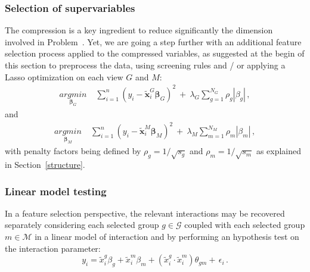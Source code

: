 \documentclass[]{book}
\begin{document}
\hypertarget{selection-of-supervariables}{%
\subsubsection*{Selection of supervariables}\label{selection-of-supervariables}}

The compression is a key ingredient to reduce significantly the
dimension involved in Problem~. Yet, we are going a step further with an
additional feature selection process applied to the compressed
variables, as suggested at the begin of this section to preprocess the
data, using screening rules and / or applying a Lasso optimization on
each view \(\mathit{G}\) and \(\mathit{M}\): \[\begin{aligned}
  \underset{\boldsymbol{\beta}_{\mathit{G}}}{argmin}  & \;
                            \sum_{i=1}^n \left(y_i - \tilde{\mathbf{x}}_{i}^{\mathit{G}}
                            \boldsymbol{\beta}_{\mathit{G}} \right)^2   \  + \
                            \lambda_{\mathit{G}} \sum_{g=1}^{N_{\mathit{G}}} \rho_g
                            |\beta_{g}| \,,\end{aligned}\] and
\[\begin{aligned}
  \underset{\boldsymbol{\beta}_{\mathit{M}}}{argmin} & \;
                           \sum_{i=1}^n \left(y_i - \tilde{\mathbf{x}}_{i}^{\mathit{M}}
                           \boldsymbol{\beta}_{\mathit{M}} \right)^2  \ + \
                           \lambda_{\mathit{M}}\sum_{m=1}^{N_{\mathit{M}}} \rho_m 
                           |\beta_{m}| \,,  \end{aligned}\] with
penalty factors being defined by
\(\displaystyle{\rho_g = 1 / \sqrt{s_g}}\) and
\(\displaystyle{\rho_m = 1 / \sqrt{s_m}}\) as explained in
Section~\ref{structure}.

\hypertarget{linear-model-testing}{%
\subsubsection*{Linear model testing}\label{linear-model-testing}}

In a feature selection perspective, the relevant interactions may be
recovered separately considering each selected group \(g \in \mathcal{G}\)
coupled with each selected group \(m \in \mathcal{M}\) in a linear model of
interaction and by performing an hypothesis test on the interaction
parameter: \[\label{eq:compact_single_interaction_model}  
  y_i = \tilde{x}_i^g \beta_{g}  +
  \tilde{x}_i^m \beta_{m}  +
  \left(\tilde{x}_i^g  \cdot
    \tilde{x}_i^m\right)
  {\theta_{gm}} + \, \epsilon_i \,.\]
\end{document}
